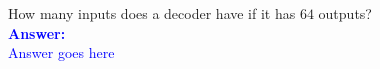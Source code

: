 \item{}
How many inputs does a decoder have if it has $64$ outputs?\\[12pt]
\ifanswers
\textcolor{blue}{
\textbf{Answer:}\\[12pt]
Answer goes here
}
\newpage
\fi

